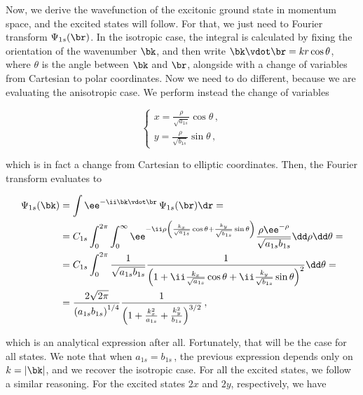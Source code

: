 Now, we derive the wavefunction of the excitonic ground state in momentum space, and the excited states will follow.
For that, we just need to Fourier transform $\Psi_{1s}(\br)$.
In the isotropic case, the integral is calculated by fixing the orientation of the wavenumber $\bk$, and then write $\bk\vdot\br= k r \cos\theta$, where $\theta$ is the angle between $\bk$ and $\br$, alongside with a change of variables from Cartesian to polar coordinates.
Now we need to do different, because we are evaluating the anisotropic case.
We perform instead the change of variables

\begin{equation}
    \label{eq:change_of_variables_elliptic_x_y}
    \begin{cases}
        x=\frac{\rho}{\sqrt{a_{1s}}}\cos\theta\,,\\
        y=\frac{\rho}{\sqrt{b_{1s}}}\sin\theta\,,
    \end{cases}
\end{equation}

\noindent which is in fact a change from Cartesian to elliptic coordinates.
\noindent Then, the Fourier transform evaluates to

\begin{equation}
    \begin{aligned}
        \Psi_{1s}(\bk) & =\int \ee^{-\ii \bk \vdot \br}\,\Psi_{1s}(\br) \dr = \\
        & = C_{1s}\int_{0}^{2\pi}\int_{0}^{\infty} \ee^{-\ii\rho\left(\frac{k_{x}}{\sqrt{a_{1s}}}\cos\theta+\frac{k_{y}}{\sqrt{b_{1s}}}\sin\theta\right)}\frac{\rho \ee^{-\rho}}{\sqrt{a_{1s}b_{1s}}} \dd \rho \dd \theta=\\
        & = C_{1s}\int_{0}^{2\pi}\frac{1}{\sqrt{a_{1s}b_{1s}}}\frac{1}{\left(1+\ii\frac{k_{x}}{\sqrt{a_{1s}}}\cos\theta+\ii\frac{k_{y}}{\sqrt{b_{1s}}}\sin\theta\right)^{2}} \dd\theta=\\
        & =\frac{2\sqrt{2\pi}}{\left(a_{1s}b_{1s}\right)^{1/4}}\frac{1}{\left(1+\frac{k_{x}^{2}}{a_{1s}}+\frac{k_{y}^{2}}{b_{1s}}\right)^{3/2}}\, ,
    \end{aligned}
\end{equation}

\noindent which is an analytical expression after all.
Fortunately, that will be the case for all states.
We note that when $a_{1s}=b_{1s}$\,, the previous expression depends only on $k=|\bk|$, and we recover the isotropic case.
For all the excited states, we follow a similar reasoning.
For the excited states $2x$ and $2y$, respectively, we have

